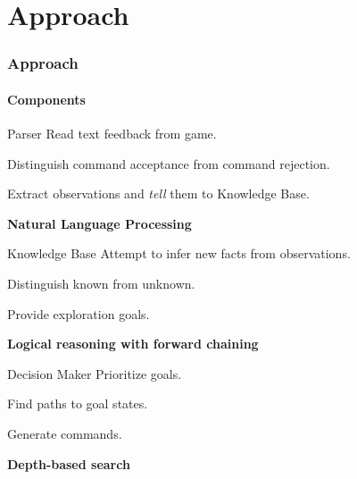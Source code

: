 \section{Approach}

\begin{frame}
    \frametitle{Approach}
    \framesubtitle{Components}

    \small

    \begin{block}{Parser}
        Read text feedback from game.

        Distinguish command acceptance from command
        rejection.

        Extract observations and \emph{tell} them to
        Knowledge Base.

        \textbf{Natural Language Processing}
    \end{block}

    \begin{block}{Knowledge Base}
        Attempt to infer new facts from observations.

        Distinguish known from unknown.


        Provide exploration goals.

        \textbf{Logical reasoning with forward chaining}
    \end{block}

    \begin{block}{Decision Maker}
        Prioritize goals.

        Find paths to goal states.

        Generate commands.

        \textbf{Depth-based search}
    \end{block}


\end{frame}

